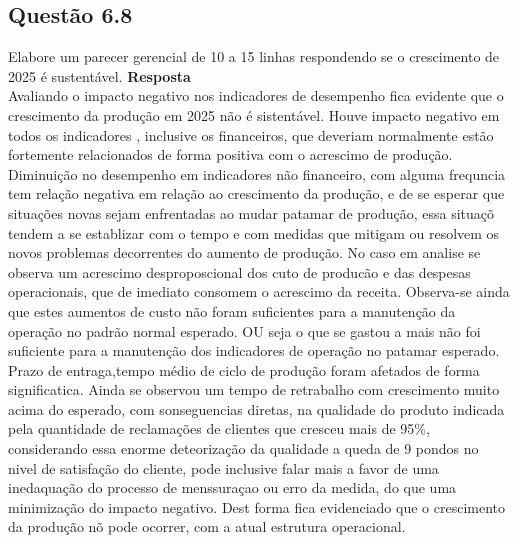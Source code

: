 \subsection{Questão 6.8}
Elabore um parecer gerencial de 10 a 15 linhas respondendo se o crescimento de 2025 é sustentável.
\textbf{Resposta}\\
Avaliando o impacto negativo nos indicadores de desempenho fica evidente que o crescimento da produção em 2025 não é sistentável. Houve impacto negativo em todos os indicadores , inclusive os financeiros, que deveriam normalmente estão fortemente relacionados de forma positiva com o acrescimo de produção. Diminuição no desempenho em indicadores não financeiro, com alguma frequncia tem relação negativa em relação ao crescimento da produção, e de se esperar que situações novas sejam enfrentadas ao mudar  patamar de produção, essa situaçõ tendem a se establizar com o tempo e com medidas que mitigam ou resolvem os novos problemas decorrentes do aumento de produção. No caso em analise se observa um acrescimo desproposcional dos cuto de producão e das despesas operacionais, que de imediato consomem o acrescimo da receita. Observa-se ainda que estes aumentos de custo não foram suficientes para a manutenção da operação no padrão normal esperado. OU seja o que se gastou a mais não foi suficiente para a manutenção dos indicadores de operação no patamar esperado. Prazo de entraga,tempo médio de ciclo de produção foram afetados de forma significatica. Ainda se observou um tempo de retrabalho com crescimento muito acima do esperado, com sonseguencias diretas, na qualidade do produto indicada pela quantidade de reclamações de clientes que cresceu mais de 95\%, considerando essa enorme deteorização da qualidade a queda de 9 pondos no nivel de satisfação do cliente, pode inclusive falar mais a favor de uma inedaquação do processo de menssuraçao ou erro da medida, do que uma minimização do impacto negativo. Dest forma fica evidenciado que o crescimento da produção nõ pode ocorrer, com a atual estrutura operacional.


